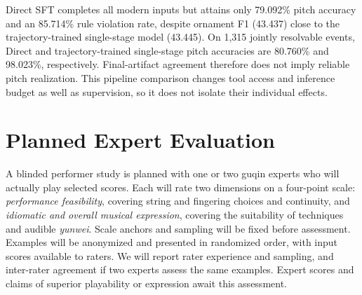 Direct SFT completes all modern inputs but attains only 79.092\% pitch accuracy and an 85.714\% rule violation rate, despite ornament F1 (43.437) close to the trajectory-trained single-stage model (43.445). On 1,315 jointly resolvable events, Direct and trajectory-trained single-stage pitch accuracies are 80.760\% and 98.023\%, respectively. Final-artifact agreement therefore does not imply reliable pitch realization. This pipeline comparison changes tool access and inference budget as well as supervision, so it does not isolate their individual effects.

\section{Planned Expert Evaluation}\label{sec:expert-protocol}
A blinded performer study is planned with one or two guqin experts who will actually play selected scores. Each will rate two dimensions on a four-point scale: \emph{performance feasibility}, covering string and fingering choices and continuity, and \emph{idiomatic and overall musical expression}, covering the suitability of techniques and audible \emph{yunwei}. Scale anchors and sampling will be fixed before assessment. Examples will be anonymized and presented in randomized order, with input scores available to raters. We will report rater experience and sampling, and inter-rater agreement if two experts assess the same examples. Expert scores and claims of superior playability or expression await this assessment.
